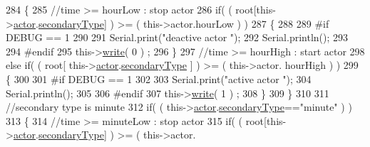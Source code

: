 \begin{DoxyCode}
284                     \{
285                         \textcolor{comment}{//time >= hourLow : stop actor}
286                         \textcolor{keywordflow}{if}( ( root[this->\hyperlink{class_cool_board_actor_a8f190db9f7a39fddbcef7f152da970e9}{actor}.\hyperlink{struct_cool_board_actor_1_1state_a44e8f69868f2491b79ed075f84aa0fcb}{secondaryType}] ) >= ( this->actor.hourLow 
      ) )  
287                         \{
288                     
289 \textcolor{preprocessor}{                        #if DEBUG == 1 }
290                         
291                             Serial.print(\textcolor{stringliteral}{"deactive actor "});
292                             Serial.println();
293                     
294 \textcolor{preprocessor}{                        #endif  }
295                             this->\hyperlink{class_cool_board_actor_a958786ff01ea1056ee72c72d439f86da}{write}( 0 ) ; 
296                         \}
297                         \textcolor{comment}{//time >= hourHigh : start actor}
298                         \textcolor{keywordflow}{else} \textcolor{keywordflow}{if}( ( root[ this->\hyperlink{class_cool_board_actor_a8f190db9f7a39fddbcef7f152da970e9}{actor}.\hyperlink{struct_cool_board_actor_1_1state_a44e8f69868f2491b79ed075f84aa0fcb}{secondaryType} ] ) >= ( this->actor.
      hourHigh ) )
299                         \{
300                     
301 \textcolor{preprocessor}{                        #if DEBUG == 1 }
302                     
303                             Serial.print(\textcolor{stringliteral}{"active actor "});
304                             Serial.println();
305                     
306 \textcolor{preprocessor}{                        #endif}
307                             this->\hyperlink{class_cool_board_actor_a958786ff01ea1056ee72c72d439f86da}{write}( 1 ) ;                 
308                         \}
309                     \}
310 
311                     \textcolor{comment}{//secondary type is minute  }
312                     \textcolor{keywordflow}{if}( ( this->\hyperlink{class_cool_board_actor_a8f190db9f7a39fddbcef7f152da970e9}{actor}.\hyperlink{struct_cool_board_actor_1_1state_a44e8f69868f2491b79ed075f84aa0fcb}{secondaryType}==\textcolor{stringliteral}{"minute"} ) )
313                     \{
314                         \textcolor{comment}{//time >= minuteLow : stop actor}
315                         \textcolor{keywordflow}{if}( ( root[this->\hyperlink{class_cool_board_actor_a8f190db9f7a39fddbcef7f152da970e9}{actor}.\hyperlink{struct_cool_board_actor_1_1state_a44e8f69868f2491b79ed075f84aa0fcb}{secondaryType}] ) >= ( this->actor.

\end{DoxyCode}
